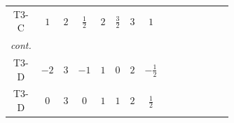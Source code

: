 \documentclass[8pt]{article}
\begin{document}
\begin{landscape}
\begin{longtable}{@{}cccccccc >{\raggedright\arraybackslash}p{0.21\linewidth} >{\raggedright\arraybackslash}p{0.21\linewidth} >{\raggedright\arraybackslash}p{0.21\linewidth}@{}}
\midrule
T3-C & $1$ & $2$ & $\frac{1}{2}$ & $2$ & $\frac{3}{2}$ & $3$ & $1$ &  & \scriptsize\adjustbox{max width=\linewidth}{$\begin{gathered} -\frac{2 \hbar  \log \left(\frac{\bar{\mu}^{2}}{M_F^2}\right) \overline{y_{2,i_1,r_1}} \overline{Y_{e,i_2,i_3}} H_{a_1} S_{2,j_1} y_{2,i_2,r_1} Y_{e,i_1,i_3} H_{a_1}{}^{\dagger } S_{2,j_1}{}^{\dagger }}{\sqrt{3}} \\ -\frac{2 \hbar  \log \left(\frac{\bar{\mu}^{2}}{M_F^2}\right) \overline{y_{2,i_1,r_1}} \overline{Y_{e,i_2,i_3}} H_{a_2} S_{2,j_2} y_{2,i_2,r_1} Y_{e,i_1,i_3} H_{a_1}{}^{\dagger } S_{2,j_1}{}^{\dagger } \mathcal{I}_{H1,a_1,a_2,j_1,j_2}{}^1}{\sqrt{3}} \\ -\sqrt{3} \hbar  \log \left(\frac{\bar{\mu}^{2}}{M_F^2}\right) \overline{y_{2,i_1,r_1}} H_{a_2} S_{2,j_2} y_{2,i_1,r_1} H_{a_1}{}^{\dagger } S_{2,j_1}{}^{\dagger } \mathcal{I}_{H2,a_1,a_2,j_1,j_2}{}^1 \lambda_{HS_2}^{(1)}\end{gathered}$} &  \\
\textit{cont.} &  &  &  &  &  &  &  &  & \scriptsize\adjustbox{max width=\linewidth}{$\begin{gathered} -\sqrt{3} \hbar  \log \left(\frac{\bar{\mu}^{2}}{M_F^2}\right) \overline{y_{2,i_1,r_1}} H_{a_2} S_{2,j_2} y_{2,i_1,r_1} H_{a_1}{}^{\dagger } S_{2,j_1}{}^{\dagger } \mathcal{I}_{H2,a_1,a_2,j_1,j_2}{}^2 \lambda_{HS_2}^{(2)}\end{gathered}$} &  \\
\midrule
T3-D & $-2$ & $3$ & $-1$ & $1$ & $0$ & $2$ & $-\frac{1}{2}$ &  & \scriptsize\adjustbox{max width=\linewidth}{$\begin{gathered} -2 \hbar  \log \left(\frac{\bar{\mu}^{2}}{M_F^2}\right) \overline{y_{2,i_1,r_1}} \overline{Y_{e,i_2,i_3}} H_{a_1} S_2 y_{2,i_2,r_1} Y_{e,i_1,i_3} H_{a_1}{}^{\dagger } S_2{}^{\dagger } \\ -2 \hbar  \log \left(\frac{\bar{\mu}^{2}}{M_F^2}\right) \overline{y_{2,i_1,r_1}} H_{a_2} S_2 y_{2,i_1,r_1} H_{a_1}{}^{\dagger } S_2{}^{\dagger } \mathcal{I}_{H2,a_1,a_2}{}^1 \lambda_{HS_2}^{(1)}\end{gathered}$} &  \\
\midrule
T3-D & $0$ & $3$ & $0$ & $1$ & $1$ & $2$ & $\frac{1}{2}$ &  & \scriptsize\adjustbox{max width=\linewidth}{$\begin{gathered} -2 \hbar  \log \left(\frac{\bar{\mu}^{2}}{M_F^2}\right) \overline{y_{2,i_1,r_1}} \overline{Y_{e,i_2,i_3}} H_{a_1} S_2 y_{2,i_2,r_1} Y_{e,i_1,i_3} H_{a_1}{}^{\dagger } S_2{}^{\dagger } \\ -2 \hbar  \log \left(\frac{\bar{\mu}^{2}}{M_F^2}\right) \overline{y_{2,i_1,r_1}} H_{a_2} S_2 y_{2,i_1,r_1} H_{a_1}{}^{\dagger } S_2{}^{\dagger } \mathcal{I}_{H2,a_1,a_2}{}^1 \lambda_{HS_2}^{(1)}\end{gathered}$} &  \\

\end{longtable}
\end{landscape}
\end{document}
